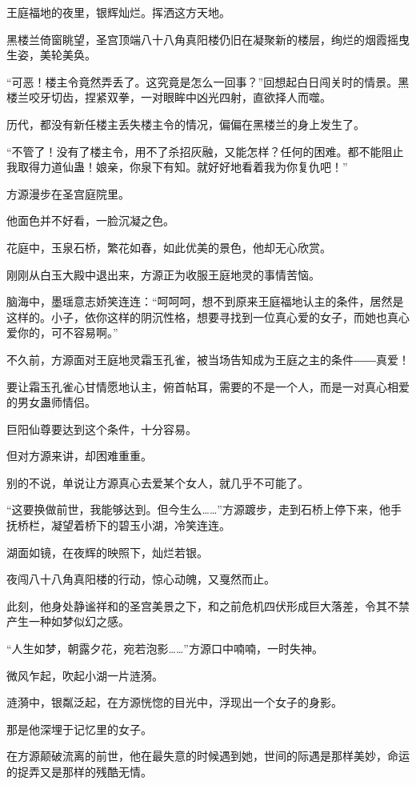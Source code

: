 \begin{this_body}
王庭福地的夜里，银辉灿烂。挥洒这方天地。

黑楼兰倚窗眺望，圣宫顶端八十八角真阳楼仍旧在凝聚新的楼层，绚烂的烟霞摇曳生姿，美轮美奂。

“可恶！楼主令竟然弄丢了。这究竟是怎么一回事？”回想起白日闯关时的情景。黑楼兰咬牙切齿，捏紧双拳，一对眼眸中凶光四射，直欲择人而噬。

历代，都没有新任楼主丢失楼主令的情况，偏偏在黑楼兰的身上发生了。

“不管了！没有了楼主令，用不了杀招灰融，又能怎样？任何的困难。都不能阻止我取得力道仙蛊！娘亲，你泉下有知。就好好地看着我为你复仇吧！”

方源漫步在圣宫庭院里。

他面色并不好看，一脸沉凝之色。

花庭中，玉泉石桥，繁花如春，如此优美的景色，他却无心欣赏。

刚刚从白玉大殿中退出来，方源正为收服王庭地灵的事情苦恼。

脑海中，墨瑶意志娇笑连连：“呵呵呵，想不到原来王庭福地认主的条件，居然是这样的。小子，依你这样的阴沉性格，想要寻找到一位真心爱的女子，而她也真心爱你的，可不容易啊。”

不久前，方源面对王庭地灵霜玉孔雀，被当场告知成为王庭之主的条件――真爱！

要让霜玉孔雀心甘情愿地认主，俯首帖耳，需要的不是一个人，而是一对真心相爱的男女蛊师情侣。

巨阳仙尊要达到这个条件，十分容易。

但对方源来讲，却困难重重。

别的不说，单说让方源真心去爱某个女人，就几乎不可能了。

“这要换做前世，我能够达到。但今生么……”方源踱步，走到石桥上停下来，他手抚桥栏，凝望着桥下的碧玉小湖，冷笑连连。

湖面如镜，在夜辉的映照下，灿烂若银。

夜闯八十八角真阳楼的行动，惊心动魄，又戛然而止。

此刻，他身处静谧祥和的圣宫美景之下，和之前危机四伏形成巨大落差，令其不禁产生一种如梦似幻之感。

“人生如梦，朝露夕花，宛若泡影……”方源口中喃喃，一时失神。

微风乍起，吹起小湖一片涟漪。

涟漪中，银粼泛起，在方源恍惚的目光中，浮现出一个女子的身影。

那是他深埋于记忆里的女子。

在方源颠破流离的前世，他在最失意的时候遇到她，世间的际遇是那样美妙，命运的捉弄又是那样的残酷无情。


\end{this_body}
